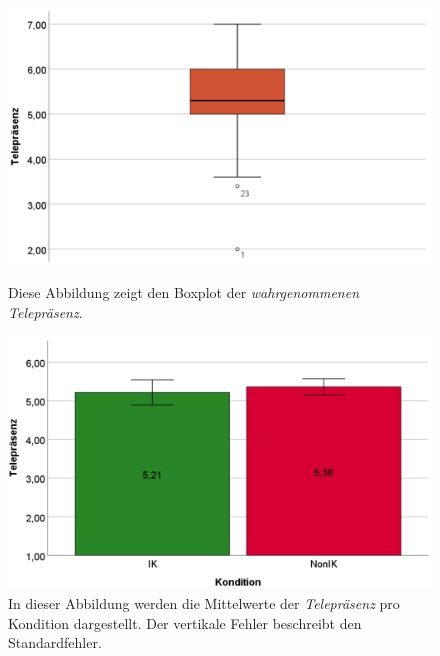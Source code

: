 \documentclass[a4paper,11pt]{article}%
\renewcommand{\\}{\vspace*{0.5\baselineskip} \newline}
\begin{document}
{	\begin{figure}[H]
   \begin{minipage}[t]{.5\linewidth} %
      \includegraphics[width=\linewidth]{Abbildungen/AuswertungDiagramme/Final/BP_Telepresence.png}
      \caption[Boxplot der wahrgenommenen Telepräsenz]{Diese Abbildung zeigt den Boxplot der \textit{wahrgenommenen Telepräsenz}.}
            \label{SD_Telepresence}
   \end{minipage}
   \hspace{.02\linewidth}%
   \begin{minipage}[t]{.5\linewidth} %
     \includegraphics[width=\linewidth]{Abbildungen/AuswertungDiagramme/Final/SD_Telepresence_Mittelwerte.png}
      \caption[Durchschnittlich wahrgenommene Telepräsenz]{In dieser Abbildung werden die Mittelwerte der \textit{Telepräsenz} pro Kondition dargestellt. Der vertikale Fehler beschreibt den Standardfehler.}
       \label{SD_Telepresence_Mittelwerte}
   \end{minipage}
\end{figure}


}
\end{document}
